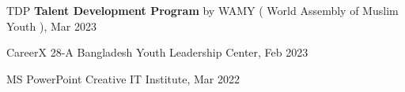 

\begin{cvskills}

  \cvskill
    {TDP} %
   {\textbf{Talent Development Program} by WAMY ( World Assembly of Muslim Youth ), Mar 2023} %
   
  \cvskill
    {CareerX 28-A} %
   {Bangladesh Youth Leadership Center, Feb 2023} %

  \cvskill
    {MS PowerPoint} %
     {Creative IT Institute, Mar 2022} %



\end{cvskills}
